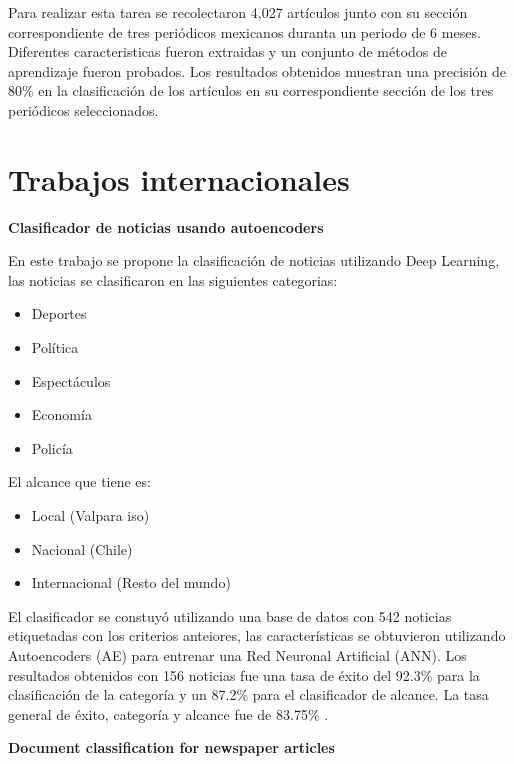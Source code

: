 Para realizar esta tarea se recolectaron 4,027 artículos junto con su sección correspondiente de tres periódicos mexicanos duranta un periodo de 6 meses. Diferentes caracteristicas fueron extraidas y un conjunto de métodos de aprendizaje fueron probados. Los resultados obtenidos muestran una precisión de 80\% en la clasificación de los artículos en su correspondiente sección de los tres periódicos seleccionados\cite{cinco}.\\


\section[Trabajos i.]{Trabajos internacionales}


\begin{large}
	 \textbf{Clasificador de noticias usando autoencoders}\\
\end{large}

En este trabajo se propone la clasificación de noticias utilizando Deep Learning, las noticias se clasificaron en las siguientes categorias:

\begin{itemize}
	\item Deportes
	\item Política
	\item Espectáculos
	\item Economía
	\item Policía
\end{itemize}
El alcance que tiene es:
\begin{itemize}
	\item Local (Valpara iso)
	\item Nacional (Chile)
	\item Internacional (Resto del mundo)
\end{itemize}
El clasificador se constuyó utilizando una base de datos con 542 noticias etiquetadas con los criterios anteiores, las características se obtuvieron utilizando Autoencoders (AE) para entrenar una Red Neuronal Artificial (ANN).
Los resultados obtenidos con 156 noticias fue una tasa de éxito del 92.3\% para la clasificación de la categoría y un 87.2\% para el clasificador de alcance.
La tasa general de éxito, categoría y alcance fue de 83.75\% \cite{seis}.\\

\begin{large}
	 \textbf{Document classification for newspaper articles}\\
\end{large}

